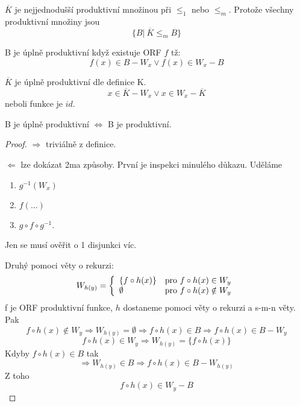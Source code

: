 \begin{consequence}
	$\overline{K}$ je nejjednodušší produktivní množinou při $\leq_1$ nebo $\leq_m$.
	Protože všechny produktivní množiny jsou
	\[ \{ B |\ \overline{K} \leq_m B \} \]
\end{consequence}

\begin{definition}
	B je úplně produktivní když existuje ORF $f$ tž:
	\[ f(x) \in B - W_x \lor f(x) \in W_x - B \]
\end{definition}

\begin{example}
	$\overline{K}$ je úplně produktivní dle definice K.
	\[ x \in \overline{K} - W_x \lor x \in W_x - \overline{K}\]
	neboli funkce je $id$.
\end{example}

\begin{theorem}
	B je úplně produktivní $\iff$ B je produktivní.
\end{theorem}
\begin{proof}
	$\Rightarrow$ triviálně z definice.

	$\Leftarrow$ lze dokázat 2ma způsoby.
	První je inspekci minulého důkazu.
	Uděláme
	\begin{enumerate}
		\item $g^{-1}(W_x)$
		\item $f(\ldots)$
		\item $g \circ f \circ g^{-1}$.
	\end{enumerate}
	Jen se musí ověřit o 1 disjunkci víc.

	Druhý pomoci věty o rekurzi:
	\[ W_{h(y)} = \left\{ \begin{array}{ll}  \{ f \circ h(x) \}  & \mbox{pro }  f \circ h(x) \in W_y  \\  \emptyset  & \mbox{pro }  f \circ h(x) \notin W_y  \end{array} \right. \]
	f je ORF produktivní funkce, $h$ dostaneme pomoci věty o rekurzi a s-m-n věty. Pak
	\[ f \circ h(x) \notin W_y \Rightarrow W_{h(y)} = \emptyset \Rightarrow f \circ h(x) \in B \Rightarrow f \circ h(x) \in B - W_y \]
	\[ f \circ h(x) \in W_y \Rightarrow W_{h(y)} = \{ f \circ h(x) \} \]
	Kdyby $f \circ h(x) \in B$ tak
	\[ \Rightarrow W_{h(y)} \in B \Rightarrow f \circ h(x) \in B - W_{h(y)} \]
	Z toho
	\[ f \circ h(x) \in W_y - B \]
\end{proof}

